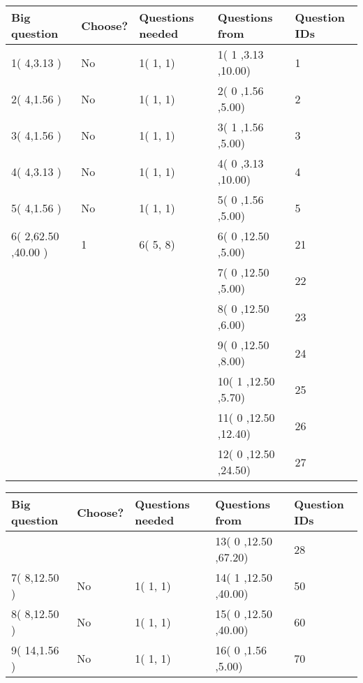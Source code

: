 \documentclass[12pt]{article}
\begin{document}
   
\noindent\hspace{-0.4in}\begin{tabular}{|l|l|l|l|l|}
\hline
 Big question & Choose? & Questions needed & Questions from & Question IDs \\ 
\hline
           1(          4,3.13
 ) &  No   & 
           1(          1,           1) &           1(          1
,3.13
 ,10.00) &           1 \\
 \hline
           2(          4,1.56
 ) &  No   & 
           1(          1,           1) &           2(          0
,1.56
 ,5.00) &           2 \\
 \hline
           3(          4,1.56
 ) &  No   & 
           1(          1,           1) &           3(          1
,1.56
 ,5.00) &           3 \\
 \hline
           4(          4,3.13
 ) &  No   & 
           1(          1,           1) &           4(          0
,3.13
 ,10.00) &           4 \\
 \hline
           5(          4,1.56
 ) &  No   & 
           1(          1,           1) &           5(          0
,1.56
 ,5.00) &           5 \\
 \hline
           6(          2,62.50
,40.00
 ) &           1 & 
           6(          5,           8) &           6(          0
,12.50
 ,5.00) &          21 \\
  & & &           7(          0
 ,12.50
 ,5.00) &          22 \\
  & & &           8(          0
 ,12.50
 ,6.00) &          23 \\
  & & &           9(          0
 ,12.50
 ,8.00) &          24 \\
  & & &          10(          1
 ,12.50
 ,5.70) &          25 \\
  & & &          11(          0
 ,12.50
 ,12.40) &          26 \\
  & & &          12(          0
 ,12.50
 ,24.50) &          27 \\
 \hline
 \end{tabular}
   
   
 \vspace{0.2in}
   
   
\noindent\hspace{-0.4in}\begin{tabular}{|l|l|l|l|l|}
\hline
 Big question & Choose? & Questions needed & Questions from & Question IDs \\ 
\hline
  & & &          13(          0
 ,12.50
 ,67.20) &          28 \\
 \hline
           7(          8,12.50
 ) &  No   & 
           1(          1,           1) &          14(          1
,12.50
 ,40.00) &          50 \\
 \hline
           8(          8,12.50
 ) &  No   & 
           1(          1,           1) &          15(          0
,12.50
 ,40.00) &          60 \\
 \hline
           9(         14,1.56
 ) &  No   & 
           1(          1,           1) &          16(          0
,1.56
 ,5.00) &          70 \\
 \hline
 \end{tabular}
 
 
\end{document}
